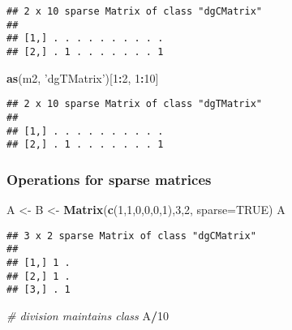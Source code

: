 \documentclass[]{article}
\newenvironment{Shaded}{\begin{snugshade}}{\end{snugshade}}
\newcommand{\CommentTok}[1]{\textcolor[rgb]{0.56,0.35,0.01}{\textit{#1}}}
\newcommand{\DataTypeTok}[1]{\textcolor[rgb]{0.13,0.29,0.53}{#1}}
\newcommand{\DecValTok}[1]{\textcolor[rgb]{0.00,0.00,0.81}{#1}}
\newcommand{\KeywordTok}[1]{\textcolor[rgb]{0.13,0.29,0.53}{\textbf{#1}}}
\newcommand{\NormalTok}[1]{#1}
\newcommand{\OperatorTok}[1]{\textcolor[rgb]{0.81,0.36,0.00}{\textbf{#1}}}
\newcommand{\OtherTok}[1]{\textcolor[rgb]{0.56,0.35,0.01}{#1}}
\newcommand{\StringTok}[1]{\textcolor[rgb]{0.31,0.60,0.02}{#1}}
\begin{document}
\begin{verbatim}
## 2 x 10 sparse Matrix of class "dgCMatrix"
##                         
## [1,] . . . . . . . . . .
## [2,] . 1 . . . . . . . 1
\end{verbatim}

\begin{Shaded}
\begin{Highlighting}[]
\KeywordTok{as}\NormalTok{(m2, }\StringTok{'dgTMatrix'}\NormalTok{)[}\DecValTok{1}\OperatorTok{:}\DecValTok{2}\NormalTok{, }\DecValTok{1}\OperatorTok{:}\DecValTok{10}\NormalTok{]}
\end{Highlighting}
\end{Shaded}

\begin{verbatim}
## 2 x 10 sparse Matrix of class "dgTMatrix"
##                         
## [1,] . . . . . . . . . .
## [2,] . 1 . . . . . . . 1
\end{verbatim}

\hypertarget{operations-for-sparse-matrices}{%
\subsubsection{Operations for sparse
matrices}\label{operations-for-sparse-matrices}}

\begin{Shaded}
\begin{Highlighting}[]
\NormalTok{A <-}\StringTok{ }\NormalTok{B <-}\StringTok{ }\KeywordTok{Matrix}\NormalTok{(}\KeywordTok{c}\NormalTok{(}\DecValTok{1}\NormalTok{,}\DecValTok{1}\NormalTok{,}\DecValTok{0}\NormalTok{,}\DecValTok{0}\NormalTok{,}\DecValTok{0}\NormalTok{,}\DecValTok{1}\NormalTok{),}\DecValTok{3}\NormalTok{,}\DecValTok{2}\NormalTok{, }\DataTypeTok{sparse=}\OtherTok{TRUE}\NormalTok{)}
\NormalTok{A}
\end{Highlighting}
\end{Shaded}

\begin{verbatim}
## 3 x 2 sparse Matrix of class "dgCMatrix"
##         
## [1,] 1 .
## [2,] 1 .
## [3,] . 1
\end{verbatim}

\begin{Shaded}
\begin{Highlighting}[]
\CommentTok{# division maintains class}
\NormalTok{A}\OperatorTok{/}\DecValTok{10}
\end{Highlighting}
\end{Shaded}
\end{document}
